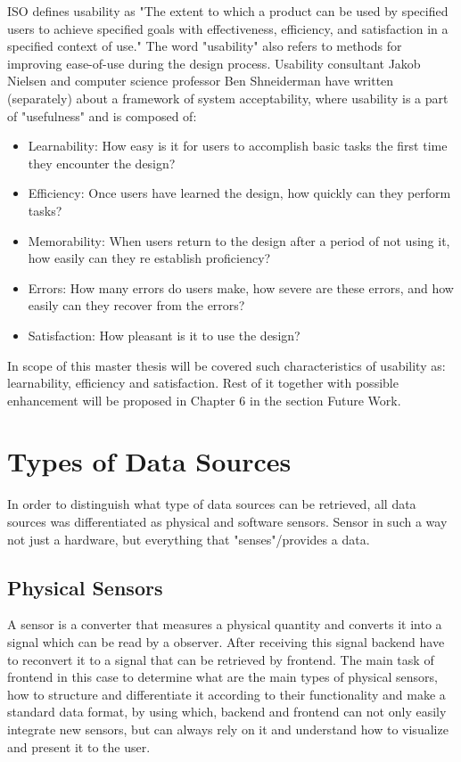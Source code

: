 	ISO defines usability as "The extent to which a product can be used by specified users to achieve specified goals with effectiveness, efficiency, and satisfaction in a specified context of use." The word "usability" also refers to methods for improving ease-of-use during the design process. Usability consultant Jakob Nielsen and computer science professor Ben Shneiderman have written (separately) about a framework of system acceptability, where usability is a part of "usefulness" and is composed of\cite{jakob}:
	\begin{itemize}
	\item Learnability: How easy is it for users to accomplish basic tasks the first time they encounter the design?
	\item Efficiency: Once users have learned the design, how quickly can they perform tasks?
	\item Memorability: When users return to the design after a period of not using it, how easily can they re establish proficiency?
	\item Errors: How many errors do users make, how severe are these errors, and how easily can they recover from the errors?
	\item Satisfaction: How pleasant is it to use the design?
	\end{itemize}

	In scope of this master thesis will be covered such characteristics of usability as: learnability, efficiency and satisfaction. Rest of it together with possible enhancement will be proposed in Chapter 6 in the section Future Work.

\section {Types of Data Sources}
    In order to distinguish what type of data sources can be retrieved, all data sources was differentiated as physical and software sensors. Sensor in such a way not just a hardware, but everything that "senses"/provides a data.

	\subsection {Physical Sensors}
	A sensor is a converter that measures a physical quantity and converts it into a signal which can be read by a observer. After receiving this signal backend have to reconvert it to a signal that can be retrieved by frontend. The main task of frontend in this case to determine what are the main types of physical sensors, how to structure and differentiate it according to their functionality and make a standard data format, by using which, backend and frontend can not only easily integrate new sensors, but can always rely on it and understand how to visualize and present it to the user.
    
